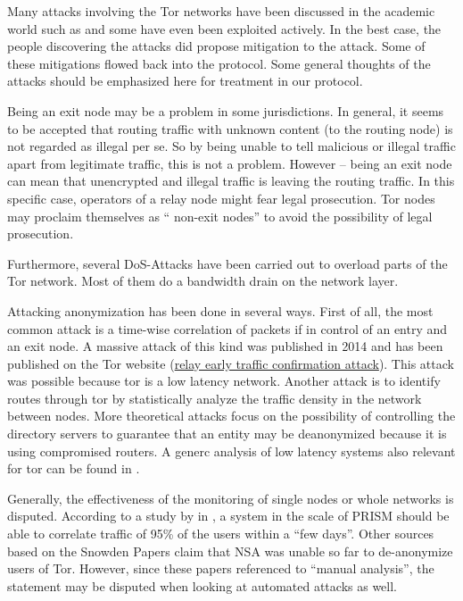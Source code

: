 Many attacks involving the Tor networks have been discussed in the academic world such as \cite{hs-attack06,esorics13-cellflood,bauer:wpes2007,esorics12-torscan,oakland2013-trawling,danner-et-al:tissec12,congestion-longpaths} and some have even been exploited actively. In the best case, the people discovering the attacks did propose mitigation to the attack. Some of these mitigations flowed back into the protocol. Some general thoughts of the attacks should be emphasized here for treatment in our protocol.

Being an exit node may be a problem in some jurisdictions. In general, it seems to be accepted that routing traffic with unknown content (to the routing node) is not regarded as illegal per se. So by being unable to tell malicious or illegal traffic apart from legitimate traffic, this is not a problem. However -- being an exit node can mean that unencrypted and illegal traffic is leaving the routing traffic. In this specific case, operators of a relay node might fear legal prosecution. Tor nodes may proclaim themselves as  `` non-exit nodes''  to avoid the possibility of legal prosecution.

Furthermore, several DoS-Attacks have been carried out to overload parts of the Tor network. Most of them do a bandwidth drain on the network layer.

Attacking anonymization has been done in several ways. First of all, the most common attack is a time-wise correlation of packets if in control of an entry and an exit node. A massive attack of this kind was published in 2014 and has been published on the Tor website (\href{https://blog.torproject.org/blog/tor-security-advisory-relay-early-traffic-confirmation-attack}{relay early traffic confirmation attack}). This attack was possible because tor is a low latency network. Another attack is to identify routes through tor by statistically analyze the traffic density in the network between nodes. More theoretical attacks focus on the possibility of controlling the directory servers to guarantee that an entity may be deanonymized because it is using compromised routers. A generc analysis of low latency systems also relevant for tor can be found in \cite{johnson2009design}.

Generally, the effectiveness of the monitoring of single nodes or whole networks is disputed. According to a study by \citeauthor{ccs2013-usersrouted} in \citeyear{ccs2013-usersrouted}\cite{ccs2013-usersrouted}, a system in the scale of PRISM should be able to correlate traffic of 95\% of the users within a ``few days''. Other sources based on the Snowden Papers claim that NSA was unable so far to de-anonymize users of  Tor. However, since these papers referenced to ``manual analysis'', the statement may be disputed when looking at automated attacks as well.

